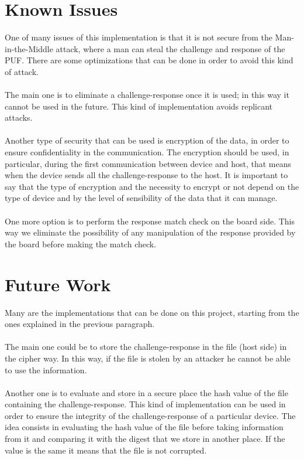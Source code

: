 \section{Known Issues}
One of many issues of this implementation is that it is not secure from the Man-in-the-Middle attack, where a man can steal the challenge and response of the PUF.
There are some optimizations that can be done in order to avoid this kind of attack.
\\
\\
The main one is to eliminate a challenge-response once it is used; in this way it cannot be used in the future. This kind of implementation avoids replicant attacks.
\\
\\
Another type of security that can be used is encryption of the data, in order to ensure confidentiality in the communication. The encryption should be used, in particular, during the first communication between device and host, that means when the device sends all the challenge-response to the host.
It is important to say that the type of encryption and the necessity to encrypt or not depend on the type of device and by the level of sensibility of the data that it can manage.
\\
\\
One more option is to perform the response match check on the board side. This way we eliminate the possibility of any manipulation of the response provided by the board before making the match check.


\section{Future Work}
Many are the implementations that can be done on this project, starting from the ones explained in the previous paragraph.
\\
\\
The main one could be to store the challenge-response in the file (host side) in the cipher way. In this way, if the file is stolen by an attacker he cannot be able to use the information.
\\
\\
Another one is to evaluate and store in a secure place the hash value of the file containing the challenge-response.
This kind of implementation can be used in order to ensure the integrity of the challenge-response of a particular device.
The idea consists in evaluating the hash value of the file before taking information from it and comparing it with the digest that we store in another place.
If the value is the same it means that the file is not corrupted.



